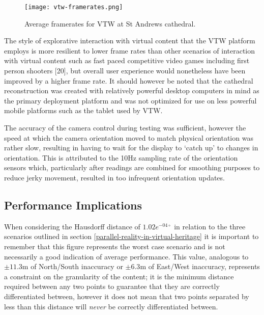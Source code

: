 \begin{figure}[h]
	\centering
	\texttt{[image: vtw-framerates.png]}
	\caption{Average framerates for VTW at St Andrews cathedral.}
	\label{vtw-framerates.png}
\end{figure}

The style of explorative interaction with virtual content that the VTW platform employs is more resilient to lower frame rates than other scenarios of interaction with virtual content such as fast paced competitive video games including first person shooters [20], but overall user experience would nonetheless have been improved by a higher frame rate. It should however be noted that the cathedral reconstruction was created with relatively powerful desktop computers in mind as the primary deployment platform and was not optimized for use on less powerful mobile platforms such as the tablet used by VTW.

The accuracy of the camera control during testing was sufficient, however the speed at which the camera orientation moved to match physical orientation was rather slow, resulting in having to wait for the display to `catch up' to changes in orientation. This is attributed to the 10Hz sampling rate of the orientation sensors which, particularly after readings are combined for smoothing purposes to reduce jerky movement, resulted in too infrequent orientation updates.


\subsection{Performance Implications}

When considering the Hausdorff distance of $1.02e^{-04\circ}$ in relation to the three scenarios outlined in section \ref{parallel-reality-in-virtual-heritage} it is important to remember that this figure represents the worst case scenario and is not necessarily a good indication of average performance. This value, analogous to $\pm11.3$m of North/South inaccuracy or $\pm6.3$m of East/West inaccuracy, represents a constraint on the granularity of the content; it is the minimum distance required between any two points to guarantee that they are correctly differentiated between, however it does not mean that two points separated by less than this distance will \textit{never} be correctly differentiated between.

